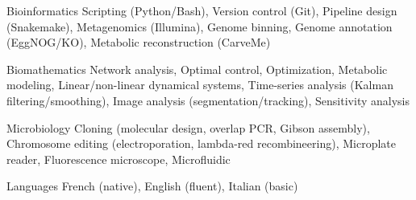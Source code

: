 

\begin{cvskills}

  \cvskill
    {Bioinformatics} %
    {Scripting (Python/Bash), Version control (Git), Pipeline design (Snakemake),
    \linebreak Metagenomics (Illumina), Genome binning, Genome annotation (EggNOG/KO), Metabolic reconstruction (CarveMe)} %

  \cvskill
    {Biomathematics} %
    {Network analysis, Optimal control, Optimization, Metabolic modeling, Linear/non-linear dynamical systems, \linebreak Time-series analysis (Kalman filtering/smoothing), Image analysis (segmentation/tracking), Sensitivity analysis} %

  \cvskill
    {Microbiology} %
    {Cloning (molecular design, overlap PCR, Gibson assembly), Chromosome editing (electroporation, \linebreak lambda-red recombineering), Microplate reader, Fluorescence microscope, Microfluidic} %

  \cvskill
    {Languages} %
    {French (native), English (fluent), Italian (basic) } %

\end{cvskills}